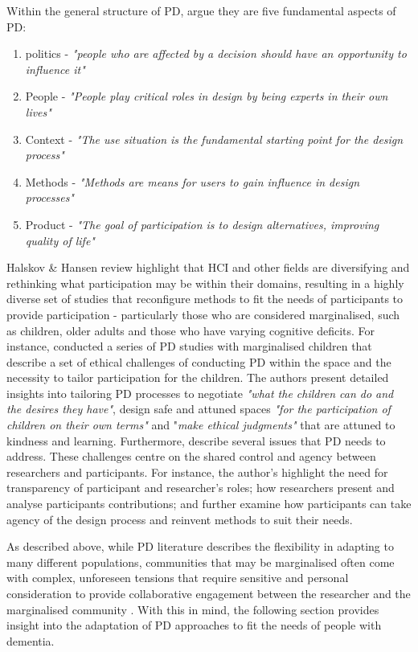 Within the general structure of PD, \cite{halskov2015diversity} argue they are five fundamental aspects of PD:
\begin{enumerate}
\item politics - \textit{"people who are affected by a decision should have an opportunity to influence it"}
\item People - \textit{"People play critical roles in design by being experts in their own lives"}
\item Context - \textit{"The use situation is the fundamental starting point for the design process"}
\item Methods - \textit{"Methods are means for users to gain influence in design processes"}
\item Product - \textit{"The goal of participation is to design alternatives, improving quality of life"}
\end{enumerate}

Halskov \& Hansen review highlight that HCI and other fields are diversifying and rethinking what participation may be within their domains, resulting in a highly diverse set of studies that reconfigure methods to fit the needs of participants to provide participation - particularly those who are considered marginalised, such as children, older adults and those who have varying cognitive deficits. For instance, \cite{spiel2018micro} conducted a series of PD studies with marginalised children that describe a set of ethical challenges of conducting PD within the space and the necessity to tailor participation for the children. The authors present detailed insights into tailoring PD processes to negotiate \textit{"what the children can do and the desires they have"}, design safe and attuned spaces \textit{"for the participation of children on their own terms"} and "\textit{make ethical judgments" }that are attuned to kindness and learning. Furthermore, \cite{vines_configuring_2013} describe several issues that PD needs to address. These challenges centre on the shared control and agency between researchers and participants. For instance, the author's highlight the need for transparency of participant and researcher's roles; how researchers present and analyse participants contributions; and further examine how participants can take agency of the design process and reinvent methods to suit their needs.

As described above, while PD literature describes the flexibility in adapting to many different populations, communities that may be marginalised often come with complex, unforeseen tensions that require sensitive and personal consideration to provide collaborative engagement between the researcher and the marginalised community \citep{harrington_deconstructing_2019}. With this in mind, the following section provides insight into the adaptation of PD approaches to fit the needs of people with dementia.


